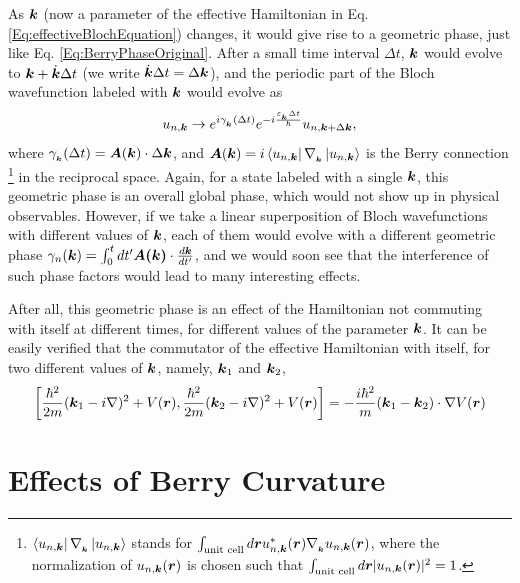 \documentclass{report}
\renewcommand\vec[1]{\ensuremath\boldsymbol{#1}} %
\begin{document}
As $\vec{k}$ (now a parameter of the effective Hamiltonian in Eq. \eqref{Eq:effectiveBlochEquation}) changes, it would give rise to a geometric phase, just like Eq. \eqref{Eq:BerryPhaseOriginal}. After a small time interval $\Delta t$, $\vec{k}$ would evolve to $\vec{k} + \dot{\vec{k}} \Delta t$ (we write $\dot{\vec{k}} \Delta t = \Delta \vec{k} $), and the periodic part of the Bloch wavefunction labeled with $\vec{k}$ would evolve as 
\begin{equation}\label{Eq:u-n-k-time-evolution}
	u_{n, \vec{k}} \rightarrow e^{i \gamma_{_{\vec{k}}}(\Delta t)} e^{-i \frac{\varepsilon_{_{\vec{k}}} \Delta t}{\hbar}} u_{n, \vec{k}+\Delta \vec{k}},
\end{equation} where $\gamma_{_{\vec{k}}}(\Delta t) =\vec{A}(\vec{k}) \cdot \Delta \vec{k}$, and $ \vec{A}(\vec{k})=i \bra{u_{n,\vec{k}}}\nabla_{_{\vec{k}}} \ket{u_{n,\vec{k}}}$ is the Berry connection \footnote{ $\bra{u_{n,\vec{k}}}\nabla_{_{\vec{k}}} \ket{u_{n,\vec{k}}}$ stands for $\int_\text{unit cell} d\vec{r} u^*_{n,\vec{k}} (\vec{r}) \nabla_{_{\vec{k}}} u_{n,\vec{k}}(\vec{r})$, where the normalization of $u_{n,\vec{k}}(\vec{r})$ is chosen such that $\int_\text{unit cell} d\vec{r} |u_{n,\vec{k}} (\vec{r})|^2 = 1$.} in the reciprocal space. Again, for a state labeled with a single $\vec{k}$, this geometric phase is an overall global phase, which would not show up in physical observables. However, if we take a linear superposition of Bloch wavefunctions with different values of $\vec{k}$, each of them would evolve with a different geometric phase $\gamma_n (\vec{k}) = \int_{0}^{t} dt' \vec{A(\vec{k})} \cdot \frac{d \vec{k}}{dt'} $, and we would soon see that the interference of such phase factors would lead to many interesting effects.

After all, this geometric phase is an effect of the Hamiltonian not commuting with itself at different times, for different values of the parameter $\vec{k}$. It can be easily verified that the commutator of the effective Hamiltonian with itself, for two different values of $\vec{k}$, namely, $\vec{k}_1$ and $\vec{k}_2$,
$$
\left[\frac{\hbar^2}{2m}(\vec{k}_1 - i \nabla)^2 + V(\vec{r}), \frac{\hbar^2}{2m}(\vec{k}_2 - i \nabla)^2 + V(\vec{r}) \right] = -\frac{i \hbar^2}{m} (\vec{k}_1 - \vec{k}_2)\cdot\nabla V(\vec{r})
$$

\section{Effects of Berry Curvature}
\end{document}
